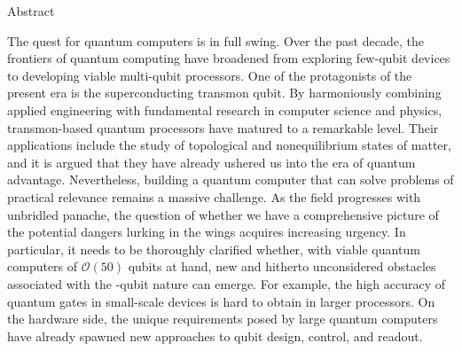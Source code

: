 \cleardoublepage
\thispagestyle{empty}

\begin{center}
{\color{maincolor2} \mainregular \Huge Abstract} 
\end{center}
\vspace{1cm}

\noindent The quest for quantum computers is in full swing. Over the past decade, the frontiers of quantum computing have broadened from exploring few-qubit devices to developing viable multi-qubit processors. One of the protagonists of the present era is the superconducting transmon qubit. By harmoniously combining applied engineering with fundamental research in computer science and physics, transmon-based quantum processors have matured to a remarkable level. Their applications include the study of topological and nonequilibrium states of matter, and it is argued that they have already ushered us into the era of quantum advantage. Nevertheless, building a quantum computer that can solve problems of practical relevance remains a massive challenge. As the field progresses with unbridled panache, the question of whether we have a comprehensive picture of the potential dangers lurking in the wings acquires increasing urgency. In particular, it needs to be thoroughly clarified whether, with viable quantum computers of $\mathcal{O}(50)$ qubits at hand, new and hitherto unconsidered obstacles associated with the -qubit nature can emerge.
For example, the high accuracy of quantum gates in small-scale devices is hard to obtain in larger processors. On the hardware side, the unique requirements posed by large quantum computers have already spawned new approaches to qubit design, control, and readout.

